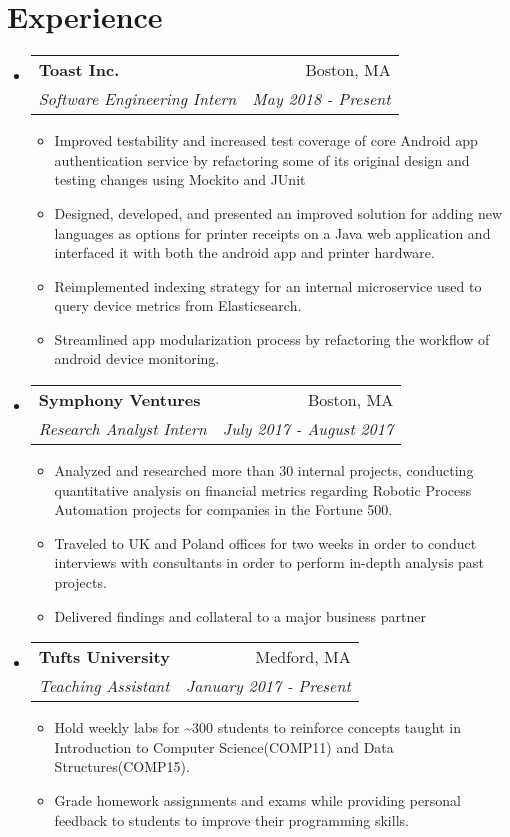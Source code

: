 \documentclass[letterpaper,11pt]{article}
\makeatletter
\newcommand{\resumeItem}[1]{
  \item[{{\textbullet}}]\small{{#1 \vspace{-2pt}}
  }
}
\newcommand{\resumeSubheading}[4]{
  \vspace{-1pt}\item[]
    \begin{tabular*}{0.97\textwidth}{l@{\extracolsep{\fill}}r}
      \textbf{#1} & #2 \\
      \textit{\small#3} & \textit{\small #4} \\
    \end{tabular*}\vspace{-5pt}
}
\newcommand{\resumeSubHeadingListStart}{\begin{itemize}[leftmargin=*]}
\newcommand{\resumeSubHeadingListEnd}{\end{itemize}}
\newcommand{\resumeItemListStart}{\begin{itemize}}
\newcommand{\resumeItemListEnd}{\end{itemize}\vspace{-5pt}}
\makeatother
\begin{document}
\section{Experience}
  \resumeSubHeadingListStart
    \resumeSubheading
      {Toast Inc.}{Boston, MA}
      {Software Engineering Intern}{May 2018 - Present}
      \resumeItemListStart
        \resumeItem
          {Improved testability and increased test coverage of core Android app authentication service by refactoring some of its original design and testing changes using Mockito and JUnit }
        \resumeItem
        {Designed, developed, and presented an improved solution for adding new languages as options for printer receipts on a Java web application and interfaced it with both the android app and printer hardware.}
        \resumeItem
          {Reimplemented indexing strategy for an internal microservice used to query device metrics from Elasticsearch.}
        \resumeItem
          {Streamlined app modularization process by refactoring the workflow of android device monitoring.}

      \resumeItemListEnd

    \resumeSubheading
      {Symphony Ventures}{Boston, MA}
      {Research Analyst Intern}{July 2017 - August 2017}
      \resumeItemListStart
        \resumeItem
          {Analyzed and researched more than 30 internal projects, conducting quantitative analysis on financial metrics regarding Robotic Process Automation projects for companies in the Fortune 500.}
        \resumeItem
          {Traveled to UK and Poland offices for two weeks in order to conduct interviews with consultants in order to perform in-depth analysis past projects.}
         \resumeItem
          {
            Delivered findings and collateral to a major business partner 
          }
      \resumeItemListEnd


    \resumeSubheading
      {Tufts University}{Medford, MA}
      {Teaching Assistant}{January 2017 - Present}
      \resumeItemListStart
        \resumeItem
          {Hold weekly labs for \textasciitilde300 students to reinforce concepts taught in Introduction to Computer Science(COMP11) and Data Structures(COMP15).}
        \resumeItem
          {Grade homework assignments and exams while providing personal feedback to students to improve their programming skills.}
          
      \resumeItemListEnd


  \resumeSubHeadingListEnd
\end{document}
